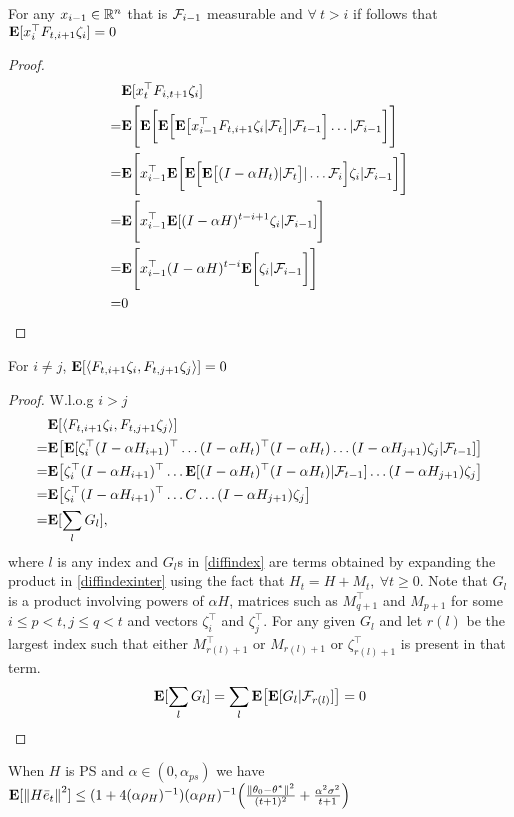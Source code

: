 \begin{lemma}
For any $x_{i-1}\in \mathbb{R}^n$ that is $\mathcal{F}_{i-1}$ measurable and $\forall ~t > i$ if follows that $\mathbf{E}[x_i^\top F_{t,i+1}\zeta_{i}]=0$
\end{lemma}
\small
\begin{proof}
\begin{align*}
&\mathbf{E}[x_t^\top F_{i,t+1}\zeta_{i}]\\
=&\mathbf{E}\Bigg[\mathbf{E}\bigg[\mathbf{E}\Big[\mathbf{E}\big[ x_{i-1}^\top F_{t,i+1}\zeta_{i}|\mathcal{F}_{t}\big]|\mathcal{F}_{t-1}\Big]\ldots|\mathcal{F}_{i-1}\bigg]\Bigg]\\
=&\mathbf{E}\Bigg[ x_{i-1}^\top \mathbf{E}\bigg[\mathbf{E}\Big[\mathbf{E}\big[(I-\alpha H_t)|\mathcal{F}_{t}\big]|\ldots \mathcal{F}_{i}\Big]\zeta_{i}|\mathcal{F}_{i-1}\bigg]\Bigg]\\
=&\mathbf{E}\Bigg[ x_{i-1}^\top \mathbf{E}[(I-\alpha H)^{t-i+1}\zeta_{i}|\mathcal{F}_{i-1}]\Bigg]\\
=&\mathbf{E}\Bigg[ x_{i-1}^\top (I-\alpha H)^{t-i}\mathbf{E}\bigg[\zeta_{i}|\mathcal{F}_{i-1}\bigg]\Bigg]\\
=&0
\end{align*}
\end{proof}

\begin{lemma}
For $i\neq j$, $\mathbf{E}[\langle F_{t,i+1}\zeta_{i},F_{t,j+1} \zeta_{j}\rangle]=0$
\end{lemma}
\begin{proof}
W.l.o.g  $i>j$
\begin{align}
&\mathbf{E}[\langle F_{t,i+1} \zeta_{i},F_{t,j+1} \zeta_{j}\rangle]\nonumber\\
\label{diffindexinter}=&\mathbf{E}\big[\mathbf{E}[ \zeta^\top_{i}(I-\alpha H_{i+1})^\top\ldots(I-\alpha H_t)^\top(I-\alpha H_t)\ldots(I-\alpha H_{j+1}) \zeta_{j}|\mathcal{F}_{t-1}]\big]\\
=&\mathbf{E}\big[ \zeta^\top_{i}(I-\alpha H_{i+1})^\top\ldots\mathbf{E}[(I-\alpha H_t)^\top(I-\alpha H_t)|\mathcal{F}_{t-1}]\ldots(I-\alpha H_{j+1}) \zeta_{j}\big]\\
=&\mathbf{E}\big[ \zeta^\top_{i}(I-\alpha H_{i+1})^\top\ldots C\ldots(I-\alpha H_{j+1}) \zeta_{j}\big]\\
\label{diffindex}=&\mathbf{E}[ \sum_{l} G_l],
\end{align}
where $l$ is any index and $G_l$s in \eqref{diffindex} are terms obtained by expanding the product in \eqref{diffindexinter} using the fact that $H_t=H+M_{t},~\forall t\geq 0$. Note that $G_l$ is a product involving powers of $\alpha H$, matrices such as $M^\top_{q+1}$ and $M_{p+1}$ for some $ i\leq p<t, j\leq q < t$ and vectors $\zeta^\top_i$ and $\zeta^\top_j$.
For any given $G_l$ and let $r(l)$ be the largest index such that either $M^\top_{r(l)+1}$ or $M_{r(l)+1}$ or $\zeta^\top_{r(l)+1}$ is present in that term.
\begin{align*}
\mathbf{E}[ \sum_{l} G_l]=  \sum_{l} \mathbf{E}\big[\mathbf{E}[G_l|\mathcal{F}_{r(l)}]\big]=0
\end{align*}
\end{proof}
\begin{theorem}
When $H$ is PS and $\alpha\in (0,\alpha_{ps})$ we have $\mathbf{E}[\left\| H\bar{e}_t\right\|^2]\leq (1+4(\alpha\rho_H)^{-1}) (\alpha\rho_H)^{-1} \Big(\frac{\left\| \theta_0-\theta^*\right\|^2}{(t+1)^2}+ \frac{\alpha^2\sigma^2}{t+1} \Big)
$
\end{theorem}

